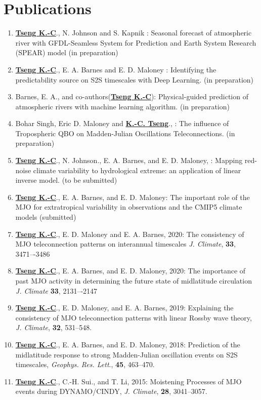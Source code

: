 \documentclass{article}
\begin{document}
\section{\color{airforceblue}Publications}
\begin{enumerate}
    \item \normalsize{\bf{\underline{Tseng K.-C}}}., N. Johnson and S. Kapnik : Seasonal forecast of atmospheric river with GFDL-Seamless System for Prediction and Earth System Research (SPEAR) model (in preparation)\par
    \item \normalsize{\bf{\underline{Tseng K.-C}}}., E. A. Barnes and E. D. Maloney : Identifying the predictability source on S2S timescales with Deep Learning. (in preparation)  \par	
	\item Barnes, E. A., and co-authors(\normalsize{\bf{\underline{Tseng K.-C}}}): Physical-guided prediction of atmospheric rivers with machine learning algorithm. (in preparation)  \par
	\item Bohar Singh, Eric D. Maloney and \normalsize{\bf{\underline{K.-C. Tseng}}}., : The influence of Tropospheric QBO on Madden-Julian Oscillations Teleconnections. (in preparation)  \par

	\item \normalsize{\bf{\underline{Tseng K.-C}}}., N. Johnson., E. A. Barnes, and E. D. Maloney, : Mapping red-noise climate variability to hydrological extreme: an application of linear inverse model. (to be submitted)  
	\item \normalsize{\bf{\underline{Tseng K.-C}}}., E. A. Barnes, and E. D. Maloney: The important role of the MJO for extratropical variability in observations and the CMIP5 climate models (submitted)   
	\item \normalsize{\bf{\underline{Tseng K.-C}}}., E. D. Maloney and E. A. Barnes, 2020: The consistency of MJO teleconnection patterns on interannual timescales \textit{J. Climate}, \normalsize{\bf{33}}, 3471–-3486
	\item \normalsize{\bf{\underline{Tseng K.-C}}}., E. A. Barnes, and E. D. Maloney, 2020: The importance of past MJO activity in determining the future state of midlatitude circulation  \textit{J. Climate} \normalsize{\bf{33}}, 2131–-2147
	\item \normalsize{\bf{\underline{Tseng K.-C}}}., E. D. Maloney, and E. A. Barnes, 2019: Explaining the consistency of MJO teleconnection patterns with linear Rossby wave theory, \textit{J. Climate}, \normalsize{\bf{32}}, 531--548.
	\item \normalsize{\bf{\underline{Tseng K.-C}}}., E. A. Barnes, and E. D. Maloney, 2018: Prediction of the midlatitude response to strong Madden-Julian oscillation events on S2S timescales, \textit{Geophys. Res. Lett}., \normalsize{\bf{45}}, 463--470. \par
	\item \normalsize{\bf{\underline{Tseng K.-C}}}., C.-H. Sui., and T. Li, 2015: Moistening Processes of MJO events during DYNAMO/CINDY, \textit{J. Climate}, \normalsize{\bf{28}}, 3041--3057.
    \end{enumerate}
\end{document}
